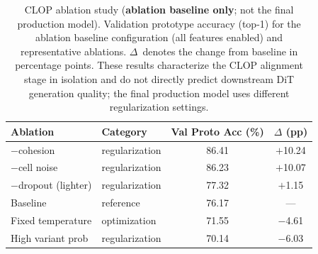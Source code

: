 \documentclass[11pt,a4paper]{article}
\begin{document}
\begin{table}[!htbp]
\caption{CLOP ablation study (\textbf{ablation baseline only}; not the final production model). Validation prototype accuracy (top-1) for the ablation baseline configuration (all features enabled) and representative ablations. $\Delta$~denotes the change from baseline in percentage points. These results characterize the CLOP alignment stage in isolation and do not directly predict downstream DiT generation quality; the final production model uses different regularization settings.\label{tab:ablation}}
\centering
\small
\begin{tabular}{llcc}
\toprule
\textbf{Ablation} & \textbf{Category} & \textbf{Val Proto Acc (\%)} & \textbf{$\Delta$ (pp)} \\
\midrule
$-$cohesion        & regularization & 86.41 & $+$10.24 \\
$-$cell noise      & regularization & 86.23 & $+$10.07 \\
$-$dropout (lighter) & regularization & 77.32 & $+$1.15 \\
Baseline           & reference      & 76.17 & --- \\
Fixed temperature   & optimization   & 71.55 & $-$4.61 \\
High variant prob   & regularization & 70.14 & $-$6.03 \\
\bottomrule
\end{tabular}
\end{table}
\end{document}

